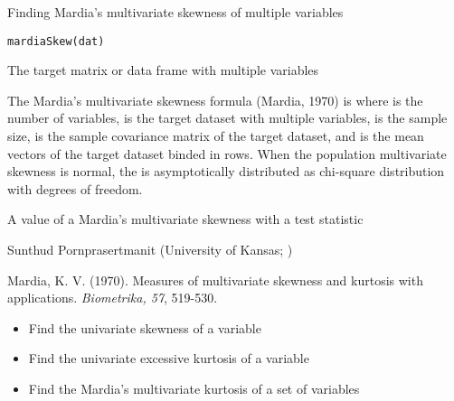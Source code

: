 \documentclass[a4paper]{book}
\begin{document}
%
\begin{Description}\relax
Finding Mardia's multivariate skewness of multiple variables
\end{Description}
%
\begin{Usage}
\begin{verbatim}
mardiaSkew(dat)
\end{verbatim}
\end{Usage}
%
\begin{Arguments}
\begin{ldescription}
\item[\code{dat}] 
The target matrix or data frame with multiple variables

\end{ldescription}
\end{Arguments}
%
\begin{Details}\relax
The Mardia's multivariate skewness formula (Mardia, 1970) is
where  is the number of variables,  is the target dataset with multiple variables,  is the sample size,  is the sample covariance matrix of the target dataset, and  is the mean vectors of the target dataset binded in  rows. When the population multivariate skewness is normal, the  is asymptotically distributed as chi-square distribution with  degrees of freedom.
\end{Details}
%
\begin{Value}
A value of a Mardia's multivariate skewness with a test statistic 
\end{Value}
%
\begin{Author}\relax
Sunthud Pornprasertmanit (University of Kansas; )
\end{Author}
%
\begin{References}\relax
Mardia, K. V. (1970). Measures of multivariate skewness and kurtosis with applications. \emph{Biometrika, 57}, 519-530.
\end{References}
%
\begin{SeeAlso}\relax
\begin{itemize}

\item {} Find the univariate skewness of a variable
\item {} Find the univariate excessive kurtosis of a variable
\item {} Find the Mardia's multivariate kurtosis of a set of variables

\end{itemize}

\end{SeeAlso}
\end{document}
